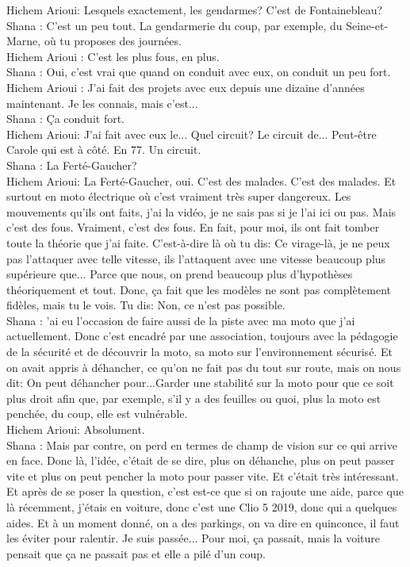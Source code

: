 Hichem Arioui: Lesquels exactement, les gendarmes? C'est de Fontainebleau?\\
Shana : C'est un peu tout. La gendarmerie du coup, par exemple, du Seine-et-Marne, où tu proposes des journées. \\
Hichem Arioui : C'est les plus fous, en plus. \\
Shana : Oui, c'est vrai que quand on conduit avec eux, on conduit un peu fort. \\
Hichem Arioui : J'ai fait des projets avec eux depuis une dizaine d'années maintenant. Je les connais, mais c'est... \\
Shana : Ça conduit fort. \\
Hichem Arioui: J'ai fait avec eux le... Quel circuit? Le circuit de... Peut-être Carole qui est à côté. En 77. Un circuit. \\
Shana : La Ferté-Gaucher? \\
Hichem Arioui: La Ferté-Gaucher, oui. C'est des malades. C'est des malades. Et surtout en moto électrique où c'est vraiment très super dangereux. Les mouvements qu'ils ont faits, j'ai la vidéo, je ne sais pas si je l'ai ici ou pas. Mais c'est des fous. Vraiment, c'est des fous. En fait, pour moi, ils ont fait tomber toute la théorie que j'ai faite. C'est-à-dire là où tu dis: Ce virage-là, je ne peux pas l'attaquer avec telle vitesse, ils l'attaquent avec une vitesse beaucoup plus supérieure que... Parce que nous, on prend beaucoup plus d'hypothèses théoriquement et tout. Donc, ça fait que les modèles ne sont pas complètement fidèles, mais tu le vois. Tu dis: Non, ce n'est pas possible. \\
Shana : 'ai eu l'occasion de faire aussi de la piste avec ma moto que j'ai actuellement. Donc c'est encadré par une association, toujours avec la pédagogie de la sécurité et de découvrir la moto, sa moto sur l'environnement sécurisé. Et on avait appris à déhancher, ce qu'on ne fait pas du tout sur route, mais on nous dit: On peut déhancher pour...Garder une stabilité sur la moto pour que ce soit plus droit afin que, par exemple, s'il y a des feuilles ou quoi, plus la moto est penchée, du coup, elle est vulnérable.\\
Hichem Arioui: Absolument. \\
Shana : Mais par contre, on perd en termes de champ de vision sur ce qui arrive en face. Donc là, l'idée, c'était de se dire, plus on déhanche, plus on peut passer vite et plus on peut pencher la moto pour passer vite. Et c'était très intéressant. Et après de se poser la question, c'est est-ce que si on rajoute une aide, parce que là récemment, j'étais en voiture, donc c'est une Clio 5 2019, donc qui a quelques aides. Et à un moment donné, on a des parkings, on va dire en quinconce, il faut les éviter pour ralentir. Je suis passée... Pour moi, ça passait, mais la voiture pensait que ça ne passait pas et elle a pilé d'un coup. \\
